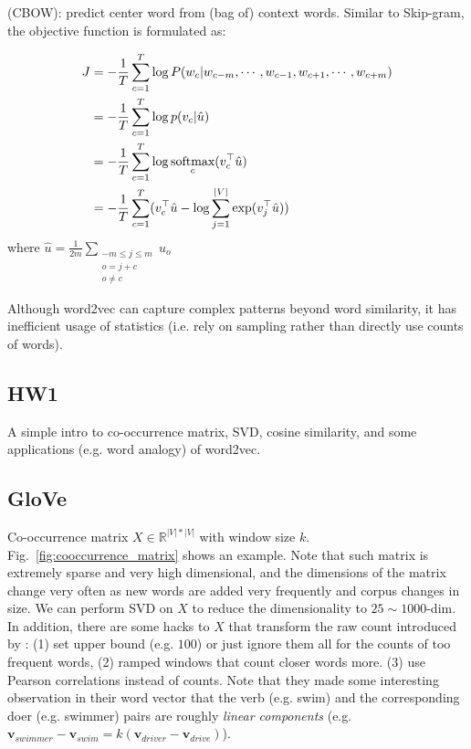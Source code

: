 
 (CBOW): predict center word from (bag of) context words.
Similar to Skip-gram, the objective function is formulated as:

\begin{align}
J &= -\frac{1}{T} \sum_{c=1}^{T} \log P (w_c | w_{c-m}, \cdots, w_{c-1}, w_{c+1}, \cdots, w_{c+m}) \\
&= -\frac{1}{T} \sum_{c=1}^{T} \log p (v_c | \hat{u}) \\
&= -\frac{1}{T} \sum_{c=1}^{T} \log \mathop{\textup{softmax}}\limits_{c}(v_c^\top \hat{u}) \\
&= -\frac{1}{T} \sum_{c=1}^{T} (v_c^\top \hat{u} - \log \sum_{j=1}^{|V|} \exp (v_j^\top \hat{u}))
\end{align}
where $\hat{u} = \frac{1}{2m} \sum_{ \substack{-m \le j \le m \\ o=j+c \\ o \ne c}} u_o$


Although word2vec can capture complex patterns beyond word similarity, it has inefficient usage of statistics (i.e. rely on sampling rather than directly use counts of words).

\subsection{HW1}

A simple intro to co-occurrence matrix, SVD, cosine similarity, and some applications (e.g. word analogy) of word2vec.

\subsection{GloVe}

Co-occurrence matrix $X \in \mathbb{R}^{|V| * |V|}$ with window size $k$.
Fig.~\ref{fig:cooccurrence_matrix} shows an example.
Note that such matrix is extremely sparse and very high dimensional, and the dimensions of the matrix change very often as new words are added very frequently and corpus changes in size.
We can perform SVD on $X$ to reduce the dimensionality to $25 \sim 1000$-dim.
In addition, there are some hacks to $X$ that transform the raw count introduced by : (1) set upper bound (e.g. $100$) or just ignore them all for the counts of too frequent words, (2) ramped windows that count closer words more. (3) use Pearson correlations instead of counts.
Note that they made some interesting observation in their word vector that the verb (e.g. swim) and the corresponding doer (e.g. swimmer) pairs are roughly \emph{linear components} (e.g. $\bm{v}_{swimmer} - \bm{v}_{swim} = k (\bm{v}_{driver} - \bm{v}_{drive})$).

